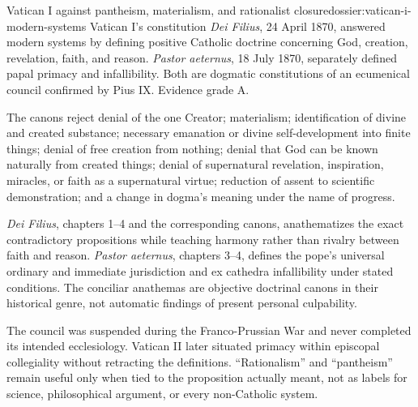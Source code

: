 \begin{heresydossier}{Vatican I against pantheism, materialism, and rationalist closure}{dossier:vatican-i-modern-systems}
\objectfield Vatican I's constitution \emph{Dei Filius}, 24 April 1870, answered modern systems by defining positive Catholic doctrine concerning God, creation, revelation, faith, and reason. \emph{Pastor aeternus}, 18 July 1870, separately defined papal primacy and infallibility. Both are dogmatic constitutions of an ecumenical council confirmed by Pius IX. Evidence grade A.

\propositionfield The canons reject denial of the one Creator; materialism; identification of divine and created substance; necessary emanation or divine self-development into finite things; denial of free creation from nothing; denial that God can be known naturally from created things; denial of supernatural revelation, inspiration, miracles, or faith as a supernatural virtue; reduction of assent to scientific demonstration; and a change in dogma's meaning under the name of progress.

\responsefield \emph{Dei Filius}, chapters 1--4 and the corresponding canons, anathematizes the exact contradictory propositions while teaching harmony rather than rivalry between faith and reason. \emph{Pastor aeternus}, chapters 3--4, defines the pope's universal ordinary and immediate jurisdiction and ex cathedra infallibility under stated conditions. The conciliar anathemas are objective doctrinal canons in their historical genre, not automatic findings of present personal culpability.

\aftermathfield The council was suspended during the Franco-Prussian War and never completed its intended ecclesiology. Vatican II later situated primacy within episcopal collegiality without retracting the definitions. ``Rationalism'' and ``pantheism'' remain useful only when tied to the proposition actually meant, not as labels for science, philosophical argument, or every non-Catholic system.
\end{heresydossier}

